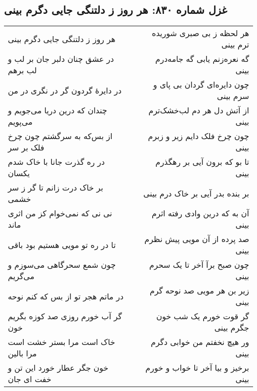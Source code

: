 \begin{center}
\section*{غزل شماره ۸۳۰: هر روز ز دلتنگی جایی دگرم بینی}
\label{sec:830}
\begin{longtable}{l p{0.5cm} r}
هر روز ز دلتنگی جایی دگرم بینی
&&
هر لحظه ز بی صبری شوریده ترم بینی
\\
در عشق چنان دلبر جان بر لب و لب برهم
&&
گه نعره‌زنم یابی گه جامه‌درم بینی
\\
در دایرهٔ گردون گر در نگری در من
&&
چون دایره‌ای گردان بی پای و سرم بینی
\\
چندان که درین دریا می‌جویم و می‌پویم
&&
از آتش دل هر دم لب‌خشک‌ترم بینی
\\
از بس‌که به سرگشتم چون چرخ فلک بر سر
&&
چون چرخ فلک دایم زیر و زبرم بینی
\\
در ره گذرت جانا با خاک شدم یکسان
&&
تا بو که برون آیی بر رهگذرم بینی
\\
بر خاک درت زانم تا گر ز سر خشمی
&&
بر بنده بدر آیی بر خاک درم بینی
\\
نی نی که نمی‌خوام کز من اثری ماند
&&
آن به که درین وادی رفته اثرم بینی
\\
تا در ره تو مویی هستیم بود باقی
&&
صد پرده از آن مویی پیش نظرم بینی
\\
چون شمع سحرگاهی می‌سوزم و می‌گریم
&&
چون صبح برآ آخر تا یک سحرم بینی
\\
در ماتم هجر تو از بس که کنم نوحه
&&
زیر بن هر مویی صد نوحه گرم بینی
\\
گر آب خورم روزی صد کوزه بگریم خون
&&
گر قوت خورم یک شب خون جگرم بینی
\\
خاک است مرا بستر خشت است مرا بالین
&&
ور هیچ نخفتم من خوابی دگرم بینی
\\
خون جگر عطار خورد این تن و خفت ای جان
&&
برخیز و بیا آخر تا خواب و خورم بینی
\\
\end{longtable}
\end{center}
